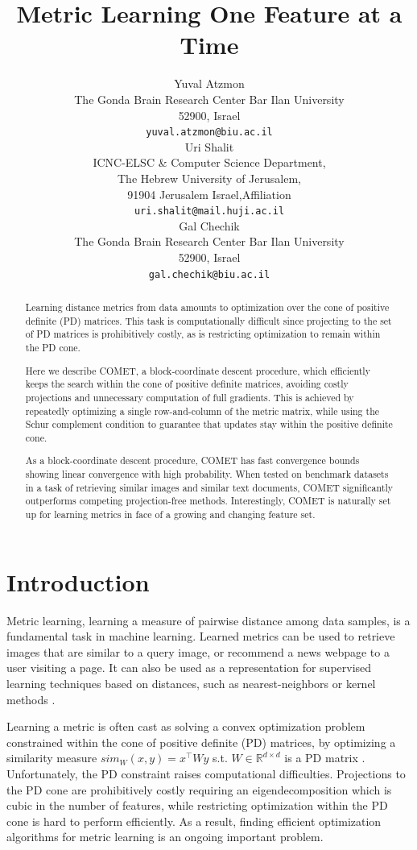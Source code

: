 \documentclass{article} %
\title{Metric Learning One Feature at a Time}
\author{
Yuval Atzmon \\
The Gonda Brain Research Center
Bar Ilan University\\
52900, Israel\\
\texttt{yuval.atzmon@biu.ac.il} \\
\And
Uri Shalit \\
ICNC-ELSC & Computer Science Department, \\
The Hebrew University of Jerusalem, \\
91904 Jerusalem Israel,Affiliation \\
\texttt{uri.shalit@mail.huji.ac.il} \\
\AND
Gal Chechik \\
The Gonda Brain Research Center
Bar Ilan University\\
52900, Israel\\
\texttt{gal.chechik@biu.ac.il}
}
\newcommand{\R}{\mathbb{R}}
\begin{document}
\maketitle
\vspace{-20pt}
\begin{abstract} 
Learning distance metrics from data amounts to optimization over the cone of positive definite (PD) matrices. This task is computationally difficult since projecting to the set of PD matrices is prohibitively costly, as is restricting optimization to remain within the PD cone.

Here we describe COMET, a block-coordinate descent procedure, which efficiently keeps the search within the cone of positive definite matrices, avoiding costly projections and unnecessary computation of full gradients. This is achieved by repeatedly optimizing a single row-and-column of the metric matrix, while using the Schur complement condition to guarantee that updates stay within the positive definite cone. 

As a block-coordinate descent procedure, COMET has fast convergence bounds showing linear convergence with high probability. When tested on benchmark datasets in a task of retrieving similar images and similar text documents, COMET significantly outperforms competing projection-free methods. Interestingly, COMET is naturally set up for learning metrics in face of a growing and changing feature set.
\end{abstract} 

\section{Introduction}
Metric learning, learning a measure of pairwise distance among data samples, is a fundamental task in machine learning. Learned metrics can be used to retrieve images that are similar to a query image, or recommend a news webpage to a user visiting a page. It can also be used as a representation for supervised learning techniques based on distances, such as nearest-neighbors or kernel methods \cite{kulis2012survey}. 

Learning a metric is often cast as solving a convex optimization problem constrained within the cone of positive definite (PD) matrices, by optimizing a similarity measure $sim_W (x,y) = x^\top W y$ s.t. $W \in \R^{d \times d}$ is a PD matrix \cite{kulis2012survey,bellet2013survey}. Unfortunately, the PD constraint raises computational difficulties. Projections to the PD cone are prohibitively costly requiring an eigendecomposition which is cubic in the number of features, while restricting optimization within the PD cone is hard to perform efficiently. As a result, finding efficient optimization algorithms for metric learning is an ongoing important problem. 
\end{document}
